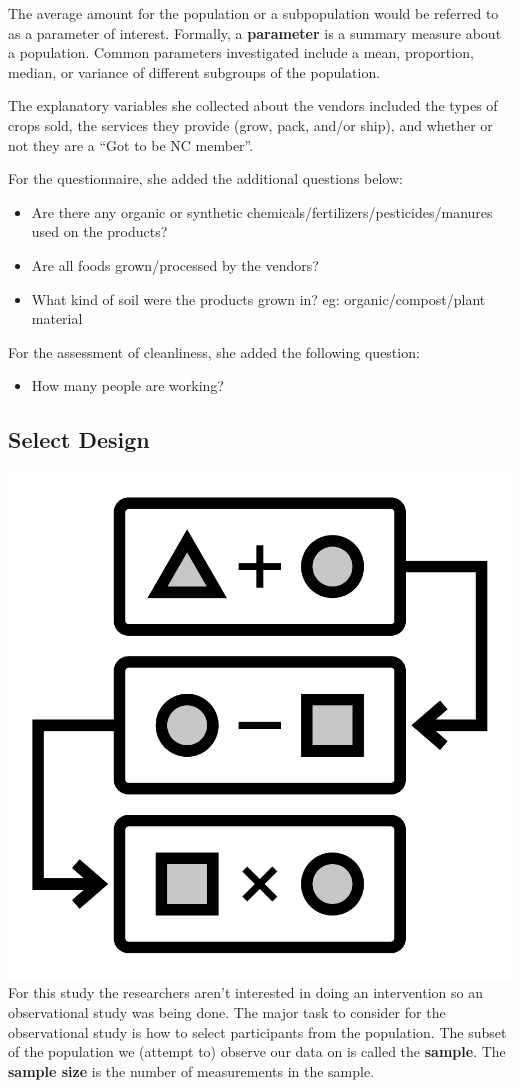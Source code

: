 \documentclass[
]{book}
\providecommand{\tightlist}{%
  \setlength{\itemsep}{0pt}\setlength{\parskip}{0pt}}
\theoremstyle{definition}
\theoremstyle{definition}
\theoremstyle{definition}
\theoremstyle{remark}
\begin{document}
The average amount for the population or a subpopulation would be referred to as a parameter of interest. Formally, a \textbf{parameter} is a summary measure about a population. Common parameters investigated include a mean, proportion, median, or variance of different subgroups of the population.

The explanatory variables she collected about the vendors included the types of crops sold, the services they provide (grow, pack, and/or ship), and whether or not they are a ``Got to be NC member''.

For the questionnaire, she added the additional questions below:

\begin{itemize}
\tightlist
\item
  Are there any organic or synthetic chemicals/fertilizers/pesticides/manures used on the products?\\
\item
  Are all foods grown/processed by the vendors?\\
\item
  What kind of soil were the products grown in? eg: organic/compost/plant material
\end{itemize}

For the assessment of cleanliness, she added the following question:

\begin{itemize}
\tightlist
\item
  How many people are working?
\end{itemize}

\hypertarget{select-design}{%
\subsection{Select Design}\label{select-design}}

\includegraphics[width=0.13\linewidth,style="float:left; padding:10px"]{img/selectDesign}
For this study the researchers aren't interested in doing an intervention so an observational study was being done. The major task to consider for the observational study is how to select participants from the population. The subset of the population we (attempt to) observe our data on is called the \textbf{sample}. The \textbf{sample size} is the number of measurements in the sample.
\end{document}
